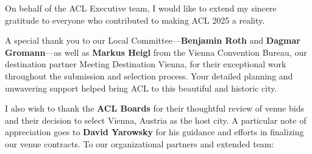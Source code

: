 On behalf of the ACL Executive team, I would like to extend my sincere gratitude to everyone who contributed to making ACL 2025 a reality.

A special thank you to our Local Committee—\textbf{Benjamin Roth} and \textbf{Dagmar Gromann}—as well as \textbf{Markus Heigl} from the Vienna Convention Bureau, our destination partner Meeting Destination Vienna, for their exceptional work throughout the submission and selection process. Your detailed planning and unwavering support helped bring ACL to this beautiful and historic city.

I also wish to thank the \textbf{ACL Boards} for their thoughtful review of venue bids and their decision to select Vienna, Austria as the host city. A particular note of appreciation goes to \textbf{David Yarowsky} for his guidance and efforts in finalizing our venue contracts.
To our organizational partners and extended team:

